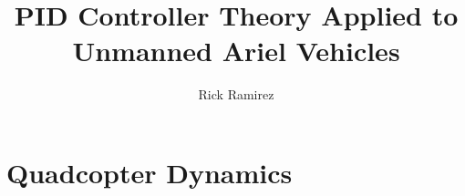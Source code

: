 \documentclass[11pt]{ucthesis}
\begin{document}

\title{PID Controller Theory Applied to Unmanned Ariel Vehicles}
\author{Rick Ramirez}
\chair{ }


\deanlineone{}
\deanlinetwo{}
\deanlinethree{}

\begin{frontmatter}

\maketitle


\tableofcontents
\listoffigures
\listoftables





\end{frontmatter}

\chapter{Quadcopter Dynamics}
\vspace{-1cm}
\end{document}
